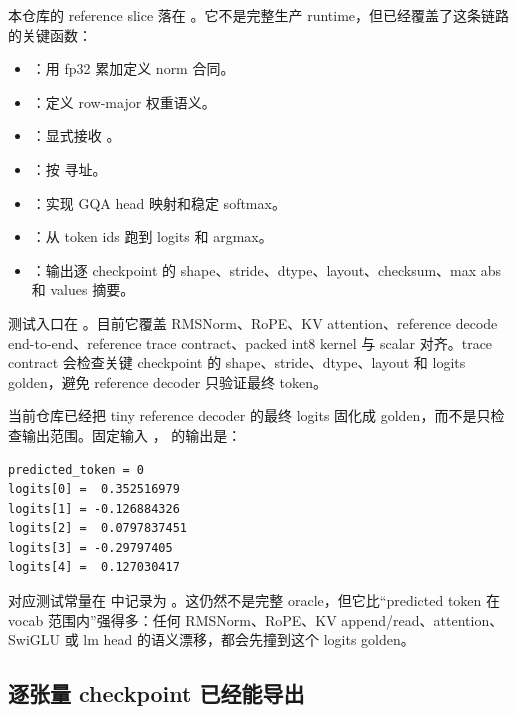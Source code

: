 本仓库的 reference slice 落在 。它不是完整生产 runtime，但已经覆盖了这条链路的关键函数：

\begin{itemize}
  \item {}：用 fp32 累加定义 norm 合同。
  \item {}：定义 row-major \code{[out,in]} 权重语义。
  \item {}：显式接收 。
  \item {}：按  寻址。
  \item {}：实现 GQA head 映射和稳定 softmax。
  \item {}：从 token ids 跑到 logits 和 argmax。
  \item {}：输出逐 checkpoint 的 shape、stride、dtype、layout、checksum、max abs 和 values 摘要。
\end{itemize}

测试入口在 。目前它覆盖 RMSNorm、RoPE、KV attention、reference decode end-to-end、reference trace contract、packed int8 kernel 与 scalar 对齐。trace contract 会检查关键 checkpoint 的 shape、stride、dtype、layout 和 logits golden，避免 reference decoder 只验证最终 token。

当前仓库已经把 tiny reference decoder 的最终 logits 固化成 golden，而不是只检查输出范围。固定输入 ， 的输出是：

\begin{lstlisting}[numbers=none,caption={lcqi reference decoder golden logits}]
predicted_token = 0
logits[0] =  0.352516979
logits[1] = -0.126884326
logits[2] =  0.0797837451
logits[3] = -0.29797405
logits[4] =  0.127030417
\end{lstlisting}

对应测试常量在  中记录为 。这仍然不是完整 oracle，但它比“predicted token 在 vocab 范围内”强得多：任何 RMSNorm、RoPE、KV append/read、attention、SwiGLU 或 lm head 的语义漂移，都会先撞到这个 logits golden。

\subsection{逐张量 checkpoint 已经能导出}

